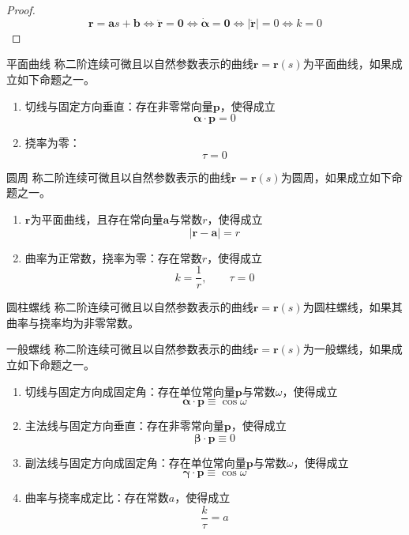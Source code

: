 \documentclass[lang = cn, scheme = chinese, thmcnt = section]{elegantbook}
\newcommand{\bs}{\boldsymbol}          %
\begin{document}
\begin{proof}
	$$
	\bs{r}=\bs{a}s+\bs{b}
	\iff
	\ddot{\bs{r}}=\bs{0}
	\iff 
	\dot{\bs{\alpha}}=\bs{0}
	\iff
	|\ddot{\bs{r}}|=0
	\iff
	k=0
	$$
\end{proof}

\begin{definition}{平面曲线}
	称二阶连续可微且以自然参数表示的曲线$\bs{r}=\bs{r}(s)$为平面曲线，如果成立如下命题之一。
	\begin{enumerate}
		\item 切线与固定方向垂直：存在非零常向量$\bs{p}$，使得成立
		$$
		\bs{\alpha}\cdot \bs{p}=0
		$$
		\item 挠率为零：
		$$
		\tau=0
		$$
	\end{enumerate}
\end{definition}

\begin{definition}{圆周}
	称二阶连续可微且以自然参数表示的曲线$\bs{r}=\bs{r}(s)$为圆周，如果成立如下命题之一。
	\begin{enumerate}
		\item $\bs{r}$为平面曲线，且存在常向量$\bs{a}$与常数$r$，使得成立
		$$
		|\bs{r}-\bs{a}|=r
		$$
		\item 曲率为正常数，挠率为零：存在常数$r$，使得成立
		$$
		k=\frac{1}{r},\qquad \tau=0
		$$
	\end{enumerate}
\end{definition}

\begin{definition}{圆柱螺线}
	称二阶连续可微且以自然参数表示的曲线$\bs{r}=\bs{r}(s)$为圆柱螺线，如果其曲率与挠率均为非零常数。
\end{definition}

\begin{definition}{一般螺线}
	称二阶连续可微且以自然参数表示的曲线$\bs{r}=\bs{r}(s)$为一般螺线，如果成立如下命题之一。
	\begin{enumerate}
		\item 切线与固定方向成固定角：存在单位常向量$\bs{p}$与常数$\omega$，使得成立
		$$
		\bs{\alpha}\cdot\bs{p}\equiv\cos\omega
		$$
		\item 主法线与固定方向垂直：存在非零常向量$\bs{p}$，使得成立
		$$
		\bs{\beta}\cdot\bs{p}\equiv 0
		$$
		\item 副法线与固定方向成固定角：存在单位常向量$\bs{p}$与常数$\omega$，使得成立
		$$
		\bs{\gamma}\cdot\bs{p}\equiv\cos\omega
		$$
		\item 曲率与挠率成定比：存在常数$a$，使得成立
		$$
		\frac{k}{\tau}=a
		$$
	\end{enumerate}
\end{definition}
\end{document}
